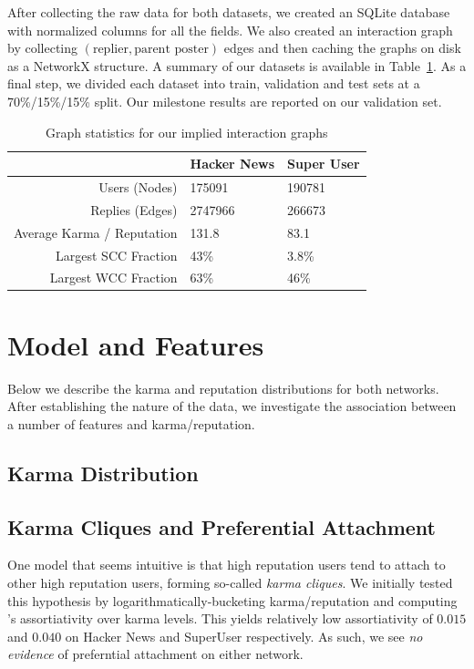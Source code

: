 \documentclass[11pt]{article}
\begin{document}
After collecting the raw data for both datasets, we created an SQLite database
with normalized columns for all the fields. We also created an interaction graph
by collecting $(\text{replier}, \text{parent poster})$ edges and then caching
the graphs on disk as a NetworkX structure. A summary of our datasets is
available in Table~\ref{tab:graphstats}. As a final step, we divided each dataset 
into train, validation and test sets at
a 70\%/15\%/15\% split. Our milestone results are reported on our validation
set.

\begin{table}[t]
\begin{center}
\begin{tabular}{| r | l l |}
\hline
& \textbf{Hacker News} & \textbf{Super User} \\
\hline
Users (Nodes) & 175091 & 190781 \\
Replies (Edges) & 2747966 & 266673 \\
Average Karma / Reputation & 131.8 & 83.1 \\
Largest SCC Fraction & 43\% & 3.8\% \\
Largest WCC Fraction & 63\% & 46\% \\
\hline
\end{tabular}
\end{center}
\caption{Graph statistics for our implied interaction graphs}
\label{tab:graphstats}
\end{table}

\section{Model and Features}
Below we describe the karma and reputation distributions for both networks.
After establishing the nature of the data, we investigate the association 
between a number of features and karma/reputation. 

\subsection{Karma Distribution}

\subsection{Karma Cliques and Preferential Attachment}
\label{sec:karma_cliques}
One model that seems intuitive is that high reputation users
tend to attach to other high reputation users, forming so-called
\textit{karma cliques}. We initially tested this hypothesis by
logarithmatically-bucketing karma/reputation and computing 
\citet{newman2003mixing}'s assortiativity over karma levels. This yields
relatively low assortiativity of $0.015$ and $0.040$ on Hacker News
and SuperUser respectively. As such, we see \textit{no evidence} of 
preferntial attachment on either network.
\end{document}
